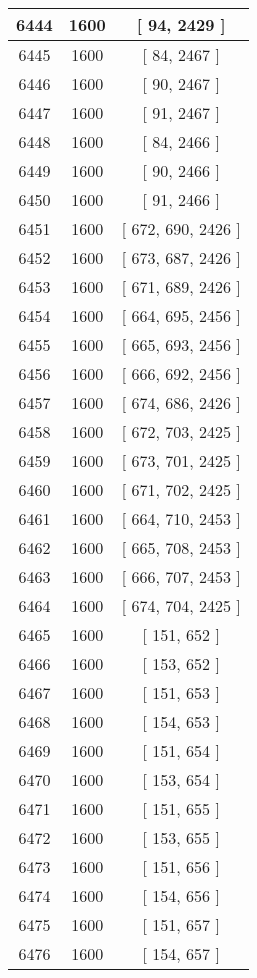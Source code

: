 \begin{center}
\begin{longtable}[H]{|| c c c ||}
\hline
6444 & 1600 & [ 94, 2429 ] \\ 
\hline
6445 & 1600 & [ 84, 2467 ] \\ 
\hline
6446 & 1600 & [ 90, 2467 ] \\ 
\hline
6447 & 1600 & [ 91, 2467 ] \\ 
\hline
6448 & 1600 & [ 84, 2466 ] \\ 
\hline
6449 & 1600 & [ 90, 2466 ] \\ 
\hline
6450 & 1600 & [ 91, 2466 ] \\ 
\hline
6451 & 1600 & [ 672, 690, 2426 ] \\ 
\hline
6452 & 1600 & [ 673, 687, 2426 ] \\ 
\hline
6453 & 1600 & [ 671, 689, 2426 ] \\ 
\hline
6454 & 1600 & [ 664, 695, 2456 ] \\ 
\hline
6455 & 1600 & [ 665, 693, 2456 ] \\ 
\hline
6456 & 1600 & [ 666, 692, 2456 ] \\ 
\hline
6457 & 1600 & [ 674, 686, 2426 ] \\ 
\hline
6458 & 1600 & [ 672, 703, 2425 ] \\ 
\hline
6459 & 1600 & [ 673, 701, 2425 ] \\ 
\hline
6460 & 1600 & [ 671, 702, 2425 ] \\ 
\hline
6461 & 1600 & [ 664, 710, 2453 ] \\ 
\hline
6462 & 1600 & [ 665, 708, 2453 ] \\ 
\hline
6463 & 1600 & [ 666, 707, 2453 ] \\ 
\hline
6464 & 1600 & [ 674, 704, 2425 ] \\ 
\hline
6465 & 1600 & [ 151, 652 ] \\ 
\hline
6466 & 1600 & [ 153, 652 ] \\ 
\hline
6467 & 1600 & [ 151, 653 ] \\ 
\hline
6468 & 1600 & [ 154, 653 ] \\ 
\hline
6469 & 1600 & [ 151, 654 ] \\ 
\hline
6470 & 1600 & [ 153, 654 ] \\ 
\hline
6471 & 1600 & [ 151, 655 ] \\ 
\hline
6472 & 1600 & [ 153, 655 ] \\ 
\hline
6473 & 1600 & [ 151, 656 ] \\ 
\hline
6474 & 1600 & [ 154, 656 ] \\ 
\hline
6475 & 1600 & [ 151, 657 ] \\ 
\hline
6476 & 1600 & [ 154, 657 ] \\ 

\end{longtable}
\end{center}
